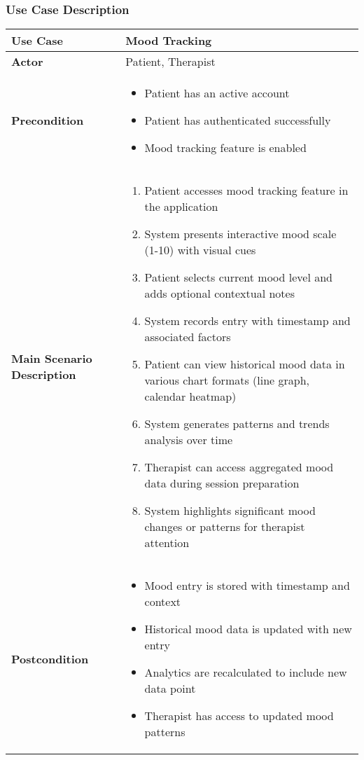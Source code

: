 \subsubsection{Use Case Description}
\begin{table}[h]
\centering
\begin{tabular}{|p{3cm}|p{10cm}|}
\hline
\textbf{Use Case} & Mood Tracking \\
\hline
\textbf{Actor} & Patient, Therapist \\
\hline
\textbf{Precondition} & 
\begin{itemize}
    \item Patient has an active account
    \item Patient has authenticated successfully
    \item Mood tracking feature is enabled
\end{itemize} \\
\hline
\textbf{Main Scenario Description} & 
\begin{enumerate}
    \item Patient accesses mood tracking feature in the application
    \item System presents interactive mood scale (1-10) with visual cues
    \item Patient selects current mood level and adds optional contextual notes
    \item System records entry with timestamp and associated factors
    \item Patient can view historical mood data in various chart formats (line graph, calendar heatmap)
    \item System generates patterns and trends analysis over time
    \item Therapist can access aggregated mood data during session preparation
    \item System highlights significant mood changes or patterns for therapist attention
\end{enumerate} \\
\hline
\textbf{Postcondition} & 
\begin{itemize}
    \item Mood entry is stored with timestamp and context
    \item Historical mood data is updated with new entry
    \item Analytics are recalculated to include new data point
    \item Therapist has access to updated mood patterns
\end{itemize} \\

\end{tabular}
\end{table}

